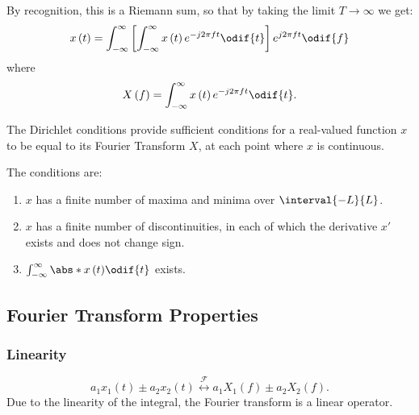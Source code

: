 \documentclass{article}
\begin{document}
By recognition, this is a Riemann sum, so that by taking the limit \(T \to \infty\) we get:
\begin{equation*}
    x\left( t \right) = \int_{-\infty}^\infty \left[ \int_{-\infty}^\infty x\left( t \right) e^{-j 2\pi f t} \odif{t} \right] e^{j 2\pi f t} \odif{f}
\end{equation*}
where
\begin{equation*}
    X\left( f \right) = \int_{-\infty}^\infty x\left( t \right) e^{-j 2\pi f t} \odif{t}.
\end{equation*}
\begin{corollary}
    The Dirichlet conditions provide sufficient conditions for a real-valued function \(x\) to be
    equal to its Fourier Transform \(X\), at each point where \(x\) is continuous.

    The conditions are:
    \begin{enumerate}
        \item \(x\) has a finite number of maxima and minima over \(\interval{-L}{L}\).
        \item \(x\) has a finite number of discontinuities, in each of which the derivative \(x'\) exists and does not change sign.
        \item \(\int_{-\infty}^\infty \abs*{x\left( t \right)} \odif{t}\) exists.
    \end{enumerate}
\end{corollary}
\subsection{Fourier Transform Properties}
\subsubsection{Linearity}
\begin{equation*}
    a_1 x_1\left( t \right) \pm a_2 x_2\left( t \right) \overset{\mathscr{F}}{\longleftrightarrow} a_1 X_1\left( f \right) \pm a_2 X_2\left( f \right).
\end{equation*}
Due to the linearity of the integral, the Fourier transform is a linear operator.
\end{document}
